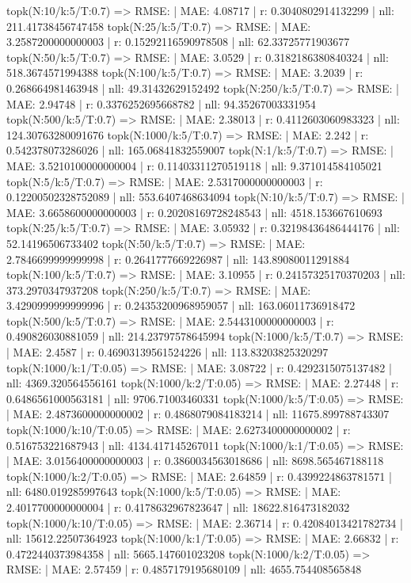 topk(N:10/k:5/T:0.7) => RMSE: | MAE: 4.08717 | r: 0.3040802914132299 | nll: 211.41738456747458
topk(N:25/k:5/T:0.7) => RMSE: | MAE: 3.2587200000000003 | r: 0.15292116590978508 | nll: 62.33725771903677
topk(N:50/k:5/T:0.7) => RMSE: | MAE: 3.0529 | r: 0.3182186380840324 | nll: 518.3674571994388
topk(N:100/k:5/T:0.7) => RMSE: | MAE: 3.2039 | r: 0.268664981463948 | nll: 49.31432629152492
topk(N:250/k:5/T:0.7) => RMSE: | MAE: 2.94748 | r: 0.3376252695668782 | nll: 94.35267003331954
topk(N:500/k:5/T:0.7) => RMSE: | MAE: 2.38013 | r: 0.4112603060983323 | nll: 124.30763280091676
topk(N:1000/k:5/T:0.7) => RMSE: | MAE: 2.242 | r: 0.542378073286026 | nll: 165.06841832559007
topk(N:1/k:5/T:0.7) => RMSE: | MAE: 3.5210100000000004 | r: 0.11403311270519118 | nll: 9.371014584105021
topk(N:5/k:5/T:0.7) => RMSE: | MAE: 2.5317000000000003 | r: 0.12200502328752089 | nll: 553.6407468634094
topk(N:10/k:5/T:0.7) => RMSE: | MAE: 3.6658600000000003 | r: 0.20208169728248543 | nll: 4518.153667610693
topk(N:25/k:5/T:0.7) => RMSE: | MAE: 3.05932 | r: 0.32198436486444176 | nll: 52.14196506733402
topk(N:50/k:5/T:0.7) => RMSE: | MAE: 2.7846699999999998 | r: 0.2641777669226987 | nll: 143.89080011291884
topk(N:100/k:5/T:0.7) => RMSE: | MAE: 3.10955 | r: 0.24157325170370203 | nll: 373.2970347937208
topk(N:250/k:5/T:0.7) => RMSE: | MAE: 3.4290999999999996 | r: 0.24353200968959057 | nll: 163.06011736918472
topk(N:500/k:5/T:0.7) => RMSE: | MAE: 2.5443100000000003 | r: 0.490826030881059 | nll: 214.23797578645994
topk(N:1000/k:5/T:0.7) => RMSE: | MAE: 2.4587 | r: 0.46903139561524226 | nll: 113.83203825320297
topk(N:1000/k:1/T:0.05) => RMSE: | MAE: 3.08722 | r: 0.4292315075137482 | nll: 4369.320564556161
topk(N:1000/k:2/T:0.05) => RMSE: | MAE: 2.27448 | r: 0.6486561000563181 | nll: 9706.71003460331
topk(N:1000/k:5/T:0.05) => RMSE: | MAE: 2.4873600000000002 | r: 0.4868079084183214 | nll: 11675.899788743307
topk(N:1000/k:10/T:0.05) => RMSE: | MAE: 2.6273400000000002 | r: 0.516753221687943 | nll: 4134.417145267011
topk(N:1000/k:1/T:0.05) => RMSE: | MAE: 3.0156400000000003 | r: 0.3860034563018686 | nll: 8698.565467188118
topk(N:1000/k:2/T:0.05) => RMSE: | MAE: 2.64859 | r: 0.4399224863781571 | nll: 6480.019285997643
topk(N:1000/k:5/T:0.05) => RMSE: | MAE: 2.4017700000000004 | r: 0.4178632967823647 | nll: 18622.816473182032
topk(N:1000/k:10/T:0.05) => RMSE: | MAE: 2.36714 | r: 0.42084013421782734 | nll: 15612.22507364923
topk(N:1000/k:1/T:0.05) => RMSE: | MAE: 2.66832 | r: 0.4722440373984358 | nll: 5665.147601023208
topk(N:1000/k:2/T:0.05) => RMSE: | MAE: 2.57459 | r: 0.4857179195680109 | nll: 4655.754408565848
